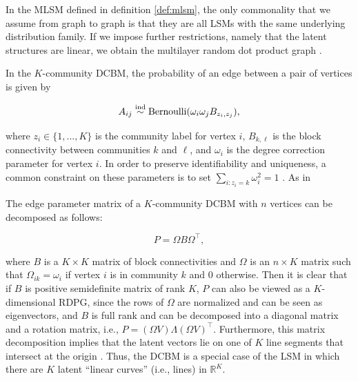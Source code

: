 \documentclass[12pt]{article}
\begin{document}
In the MLSM defined in definition \ref{def:mlsm}, the only commonality
that we assume from graph to graph is that they are all LSMs with the
same underlying distribution family. If we impose further restrictions,
namely that the latent structures are linear, we obtain the multilayer
random dot product graph \citep{jones2021multilayer}.

\begin{example}
In the $K$-community DCBM, the probability of an edge between a pair of vertices is given by

$$A_{ij} \stackrel{\mathrm{ind}}{\sim} \mathrm{Bernoulli}(\omega_i \omega_j B_{z_i, z_j}),$$

where $z_i \in \{1, ..., K\}$ is the community label for vertex $i$, $B_{k, \ell}$ is the block connectivity between communities $k$ and $\ell$, and $\omega_i$ is the degree correction parameter for vertex $i$. 
In order to preserve identifiability and uniqueness, a common constraint on these parameters is to set $\sum_{i : z_i = k} \omega_i^2 = 1$ \citep{Karrer_2011}. 
As in 

The edge parameter matrix of a $K$-community DCBM with $n$ vertices can be decomposed as follows:

$$P = \Omega B \Omega^\top,$$

where $B$ is a $K \times K$ matrix of block connectivities and $\Omega$ is an $n \times K$ matrix such that $\Omega_{ik} = \omega_i$ if vertex $i$ is in community $k$ and $0$ otherwise. 
Then it is clear that if $B$ is positive semidefinite matrix of rank $K$, $P$ can also be viewed as a $K$-dimensional RDPG, since the rows of $\Omega$ are normalized and can be seen as eigenvectors, and $B$ is full rank and can be decomposed into a diagonal matrix and a rotation matrix, i.e., $P = (\Omega V) \Lambda (\Omega V)^\top$. 
Furthermore, this matrix decomposition implies that the latent vectors lie on one of $K$ line segments that intersect at the origin \citep{rubindelanchy2017statistical}. 
Thus, the DCBM is a special case of the LSM in which there are $K$ latent ``linear curves'' (i.e., lines) in $\mathbb{R}^K$. 


\end{example}
\end{document}
